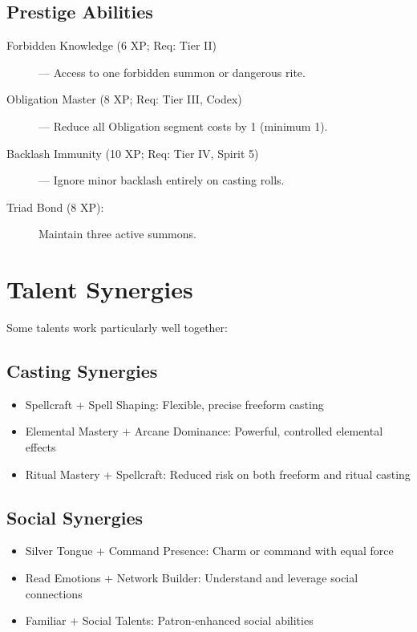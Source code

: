 \documentclass[11pt,twoside,openany]{book}
\begin{document}
\subsection*{Prestige Abilities}

\begin{description}
\item[Forbidden Knowledge (6 XP; Req: Tier II)] --- Access to one forbidden summon or dangerous rite.
\item[Obligation Master (8 XP; Req: Tier III, Codex)] --- Reduce all Obligation segment costs by 1 (minimum 1).
\item[Backlash Immunity (10 XP; Req: Tier IV, Spirit 5)] --- Ignore minor backlash entirely on casting rolls.
\item[Triad Bond (8 XP):] Maintain three active summons.
\end{description}

\section*{Talent Synergies} 

Some talents work particularly well together:

\subsection*{Casting Synergies}

\begin{itemize}
\item Spellcraft + Spell Shaping: Flexible, precise freeform casting
\item Elemental Mastery + Arcane Dominance: Powerful, controlled elemental effects
\item Ritual Mastery + Spellcraft: Reduced risk on both freeform and ritual casting
\end{itemize}

\subsection*{Social Synergies}

\begin{itemize}
\item Silver Tongue + Command Presence: Charm or command with equal force
\item Read Emotions + Network Builder: Understand and leverage social connections
\item Familiar + Social Talents: Patron-enhanced social abilities
\end{itemize}
\end{document}
